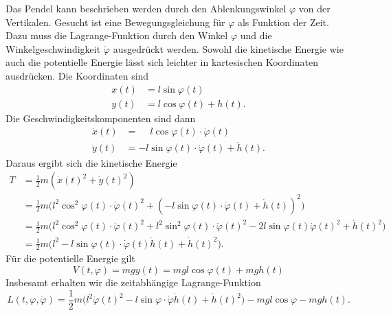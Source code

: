 Das Pendel kann beschrieben werden durch den Ablenkungswinkel $\varphi$
von der Vertikalen.
Gesucht ist eine Bewegungsgleichung für $\varphi$ als Funktion der Zeit.
Dazu muss die Lagrange-Funktion durch den Winkel $\varphi$ und die
Winkelgeschwindigkeit $\dot{\varphi}$ ausgedrückt werden.
Sowohl die kinetische Energie wie auch die potentielle Energie lässt
sich leichter in kartesischen Koordinaten ausdrücken.
Die Koordinaten sind
\begin{align*}
x(t)
&=
l \sin\varphi(t)
\\
y(t)
&=
l \cos\varphi(t) + h(t).
\end{align*}
Die Geschwindigkeitskomponenten sind dann
\begin{align*}
\dot{x}(t) &= \phantom{-}l \cos\varphi(t)\cdot \dot{\varphi}(t) \\
\dot{y}(t) &=          - l \sin\varphi(t)\cdot \dot{\varphi}(t) + \dot{h}(t).
\end{align*}
Daraus ergibt sich die kinetische Energie
\begin{align*}
T
&=
\frac12
m(\dot{x}(t)^2 + \dot{y}(t)^2)
\\
&=
\frac12m\bigl(
l^2 \cos^2 \varphi(t)\cdot\dot{\varphi}(t)^2
+
(-l\sin\varphi(t)\cdot\dot{\varphi}(t) + \dot{h}(t))^2
\bigr)
\\
&=
\frac12m\bigl(
l^2 \cos^2\varphi(t)\cdot\dot{\varphi}(t)^2
+
l^2 \sin^2\varphi(t)\cdot\dot{\varphi}(t)^2
-
2l\sin\varphi(t)\dot{\varphi}(t)^2
+
\dot{h}(t)^2
\bigr)
\\
&=
\frac12m\bigl(
l^2
-
l\sin \varphi(t)\cdot \dot{\varphi}(t)\dot{h}(t) + \dot{h}(t)^2
\bigr)
.
\end{align*}
Für die potentielle Energie gilt
\[
V(t,\varphi)
=
mgy(t)
=
mgl\cos\varphi(t) + mgh(t)
\]
Insbesamt erhalten wir die zeitabhängige Lagrange-Funktion
\[
L(t,\varphi,\dot{\varphi})
=
\frac12m\bigl(
l^2\dot{\varphi}(t)^2
-
l\sin \varphi\cdot \dot{\varphi}\dot{h}(t) + \dot{h}(t)^2
\bigr)
-
mgl\cos\varphi - mgh(t).
\]

%
%
